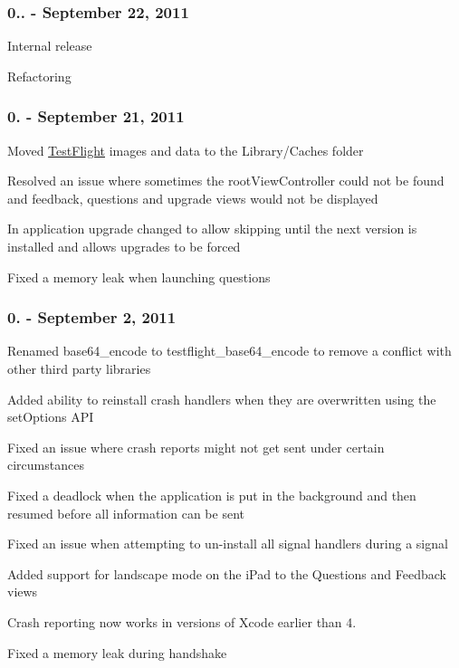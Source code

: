 \subsubsection*{0.. -\/ September 22, 2011}


\begin{DoxyItemize}
\item Internal release
\item Refactoring
\end{DoxyItemize}

\subsubsection*{0. -\/ September 21, 2011}


\begin{DoxyItemize}
\item Moved \hyperlink{interface_test_flight}{Test\-Flight} images and data to the Library/\-Caches folder
\item Resolved an issue where sometimes the root\-View\-Controller could not be found and feedback, questions and upgrade views would not be displayed
\item In application upgrade changed to allow skipping until the next version is installed and allows upgrades to be forced
\item Fixed a memory leak when launching questions
\end{DoxyItemize}

\subsubsection*{0. -\/ September 2, 2011}


\begin{DoxyItemize}
\item Renamed base64\-\_\-encode to testflight\-\_\-base64\-\_\-encode to remove a conflict with other third party libraries
\item Added ability to reinstall crash handlers when they are overwritten using the set\-Options A\-P\-I
\item Fixed an issue where crash reports might not get sent under certain circumstances
\item Fixed a deadlock when the application is put in the background and then resumed before all information can be sent
\item Fixed an issue when attempting to un-\/install all signal handlers during a signal
\item Added support for landscape mode on the i\-Pad to the Questions and Feedback views
\item Crash reporting now works in versions of Xcode earlier than 4.
\item Fixed a memory leak during handshake
\end{DoxyItemize}

